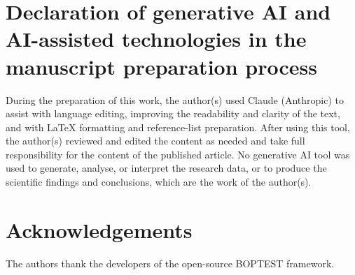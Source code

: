 \documentclass[a4paper,fleqn]{cas-sc}
\begin{document}
\section*{Declaration of generative AI and AI-assisted technologies in the manuscript preparation process}
During the preparation of this work, the author(s) used Claude (Anthropic) to
assist with language editing, improving the readability and clarity of the text,
and with \LaTeX{} formatting and reference-list preparation. After using this tool,
the author(s) reviewed and edited the content as needed and take full responsibility
for the content of the published article. No generative AI tool was used to generate,
analyse, or interpret the research data, or to produce the scientific findings and
conclusions, which are the work of the author(s).

\section*{Acknowledgements}
The authors thank the developers of the open-source BOPTEST framework. %



\end{document}
